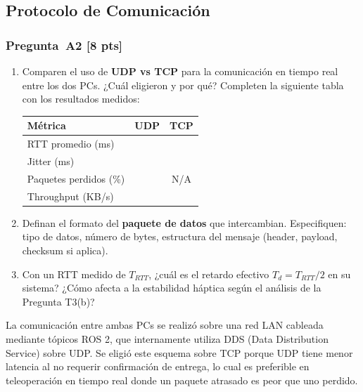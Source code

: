 \documentclass[journal,10pt,twoside]{IEEEtran}
\newcommand{\answerline}{\underline{\hspace{1.5cm}}}
\newcommand{\answerline}[1][3cm]{\underline{\hspace{#1}}}
\newcommand{\pts}[1]{\textbf{\color{tec_red}[#1 pts]}}
\begin{document}
\subsection{Protocolo de Comunicación}


\subsubsection*{Pregunta~A2 \pts{8}}
\begin{enumerate}[label=(\alph*)]
  \item Comparen el uso de \textbf{UDP vs TCP} para la comunicación
        en tiempo real entre los dos PCs. ¿Cuál eligieron y por qué?
        Completen la siguiente tabla con los resultados medidos:

        \begin{center}
        \begin{tabular}{lcc}
          \toprule
          
          \textbf{Métrica} & \textbf{UDP} & \textbf{TCP} \\
          \midrule
          RTT promedio (ms)     & \answerline & \answerline \\
          Jitter (ms)           & \answerline & \answerline \\
          Paquetes perdidos (\%) & \answerline & N/A \\
          Throughput (KB/s)     & \answerline & \answerline \\
          
          \bottomrule
        \end{tabular}
        \end{center}

  \item Definan el formato del \textbf{paquete de datos} que intercambian.
        Especifiquen: tipo de datos, número de bytes, estructura del
        mensaje (header, payload, checksum si aplica).
  \item Con un RTT medido de $T_{RTT}$, ¿cuál es el retardo efectivo
        $T_d = T_{RTT}/2$ en su sistema? ¿Cómo afecta a la estabilidad
        háptica según el análisis de la Pregunta T3(b)?
\end{enumerate}

La comunicación entre ambas PCs se realizó sobre una red LAN 
cableada mediante tópicos ROS 2, que internamente utiliza DDS 
(Data Distribution Service) sobre UDP. Se eligió este esquema 
sobre TCP porque UDP tiene menor latencia al no requerir 
confirmación de entrega, lo cual es preferible en teleoperación 
en tiempo real donde un paquete atrasado es peor que uno perdido.
\\
\end{document}
